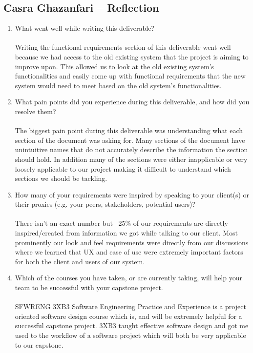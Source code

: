 \documentclass[12pt]{article}
\begin{document}
\begin{enumerate}
\end{enumerate}

\subsection*{Casra Ghazanfari -- Reflection}

\begin{enumerate}
  \item What went well while writing this deliverable?\\\\
  Writing the functional requirements section of this deliverable went well 
  because we had access to the old existing system that the project is aiming 
  to improve upon. This allowed us to look at the old existing system’s functionalities 
  and easily come up with functional requirements that the new system would need to meet 
  based on the old system’s functionalities.
  \item What pain points did you experience during this deliverable, and how
  did you resolve them?\\\\
  The biggest pain point during this deliverable was understanding what each section 
  of the document was asking for. Many sections of the document have unintuitive names 
  that do not accurately describe the information the section should hold. In addition many 
  of the sections were either inapplicable or very loosely applicable to our project making 
  it difficult to understand which sections we should be tackling.
  \item How many of your requirements were inspired by speaking to your
  client(s) or their proxies (e.g. your peers, stakeholders, potential users)?
  \\\\
  There isn’t an exact number but ~25\% of our requirements are directly inspired/created 
  from information we got while talking to our client. Most prominently our look and feel 
  requirements were directly from our discussions where we learned that UX and ease of use 
  were extremely important factors for both the client and users of our system.
  \item Which of the courses you have taken, or are currently taking, will help
  your team to be successful with your capstone project.\\\\
  SFWRENG 3XB3 Software Engineering Practice and Experience is a project oriented software 
  design course which is, and will be extremely helpful for a successful capstone project. 
  3XB3 taught effective software design and got me used to the workflow of a software project 
  which will both be very applicable to our capstone.
\end{enumerate}
\end{document}
